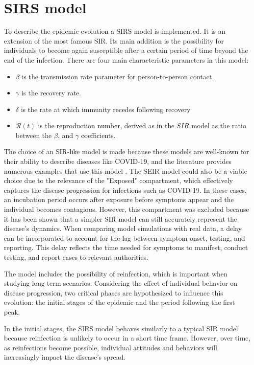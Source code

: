 \section{SIRS model}
\label{sec:SIRS}
To describe the epidemic evolution a  SIRS model is implemented. It is an extension of the most famous SIR. Its main addition is the possibility for individuals to become again susceptible after a certain period of time beyond the end of the infection. There are four main characteristic parameters in this model:
\begin{itemize}
	\item $\beta$ is the transmission rate parameter for person-to-person
	contact.
	\item $\gamma$ is the recovery rate.
	\item  $\delta$ is the rate at which immunity recedes following recovery
	\item  $\mathcal{R}(t)$ is the reproduction number, derived as in the $SIR$ model as the ratio between the $\beta$, and $\gamma$ coefficients.
	
\end{itemize}
The choice of an SIR-like model is made because these models are well-known for their ability to describe diseases like COVID-19, and the literature provides numerous examples that use this model \cite{Dehning_2020, Li2022}. The SEIR model could also be a viable choice due to the relevance of the "Exposed" compartment, which effectively captures the disease progression for infections such as COVID-19. In these cases, an incubation period occurs after exposure before symptoms appear and the individual becomes contagious. However, this compartment was excluded because it has been shown \cite{Dehning_2020} that a simpler SIR model can still accurately represent the disease's dynamics. When comparing model simulations with real data, a delay can be incorporated to account for the lag between symptom onset, testing, and reporting. This delay reflects the time needed for symptoms to manifest, conduct testing, and report cases to relevant authorities.

The model includes the possibility of reinfection, which is important when studying long-term scenarios. Considering the effect of individual behavior on disease progression, two critical phases are hypothesized to influence this evolution: the initial stages of the epidemic and the period following the first peak.

In the initial stages, the SIRS model behaves similarly to a typical SIR model because reinfection is unlikely to occur in a short time frame. However, over time, as reinfections become possible, individual attitudes and behaviors will increasingly impact the disease's spread.


